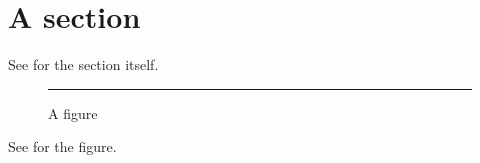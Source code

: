 \documentclass{article}
\begin{document}
\section{A section}\label{sec:one}
See  for the section itself.
\begin{figure}
\centering
\rule{3cm}{1cm}
\caption{A figure}\label{fig:one}
\end{figure}
See  for the figure.
\end{document}
